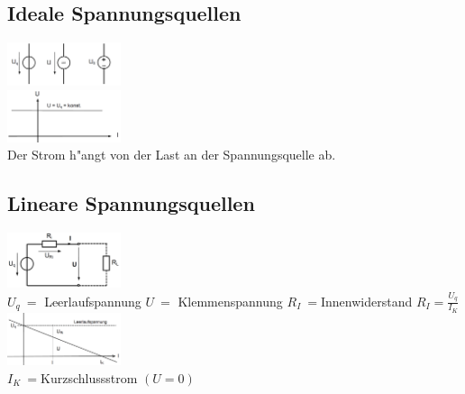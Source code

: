 \subsection{Ideale Spannungsquellen}
\begin{multicols}{4}
\includegraphics[width=0.25\textwidth]{pics/quellen/UQsymbole}\\
\includegraphics[width=0.25\textwidth]{pics/quellen/QUkennlinie}\\
Der Strom h"angt von der Last an der Spannungsquelle ab.\\
\end{multicols}

\subsection{Lineare Spannungsquellen}
\begin{multicols}{4}
\includegraphics[width=0.25\textwidth]{pics/quellen/lUEquelle}\\
$U_q\ =$ Leerlaufspannung
$U\ =$ Klemmenspannung
$R_I\ =$Innenwiderstand
$R_I=\frac{U_q}{I_K}$\\
\includegraphics[width=0.25\textwidth]{pics/quellen/UIkennlinie}\\
$I_K\ =$Kurzschlussstrom $(U=0)$\\
\end{multicols}

